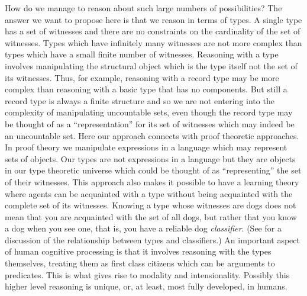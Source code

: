 How do we manage to reason about such large numbers of possibilities?
The answer we want to propose here is that we reason in terms of
types.  A single type has a set of witnesses and there are no
constraints on the cardinality of the set of witnesses.  Types which
have infinitely many witnesses are not more complex than types which
have a small finite number of witnesses.  Reasoning with a type
involves manipulating the structural object which is the type itself
not the set of its witnesses.  Thus, for example, reasoning with a
record type may be more complex than reasoning with a basic type that
has no components.  But still a record type is always a finite
structure and so we are not entering into the complexity of
manipulating uncountable sets, even though the record type may be
thought of as a ``representation'' for its set of witnesses which may
indeed be an uncountable set.  Here our approach connects
with proof theoretic approaches.  In proof theory we manipulate
expressions in a language which may represent sets of objects.  Our
types are not expressions in a language but they are objects in our
type theoretic universe which could be thought of as ``representing''
the set of their witnesses.  This approach also makes it possible to have a
learning theory where agents can be acquainted with a type without
being acquainted with the complete set of its witnesses.  Knowing a
type whose witnesses are dogs does not mean that you are acquainted
with the set of all dogs, but rather that you know a dog when you see
one, that is, you have a reliable dog \textit{classifier}.  (See
\citealp{Larsson2013} for a discussion of the relationship between types
and classifiers.) An important aspect of human cognitive processing is
that it involves reasoning with the types themselves, treating them as
first class citizens which can be arguments to predicates.  This is
what gives rise to modality and intensionality.  Possibly this higher
level reasoning is unique, or, at least, most fully developed, in
humans.

